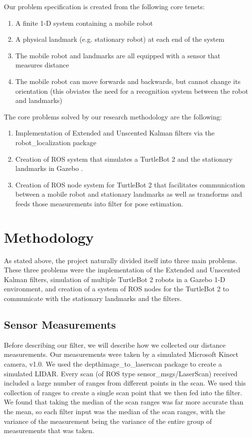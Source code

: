 \documentclass[conference]{IEEEtran} \usepackage[T1]{fontenc} \usepackage[backend=biber, style=ieee]{biblatex}
\begin{document}
Our problem specification is created from the following core tenets:
\begin{enumerate} 
\item A finite 1-D system containing a mobile robot 
\item A physical landmark (e.g. stationary robot) at each end of the system
\item The mobile robot and landmarks are all equipped with a sensor that measures distance 
\item The mobile robot can move forwards and backwards, but cannot change its orientation (this obviates the need for a 
recognition system between the robot and landmarks)
\end{enumerate}

The core problems solved by our research methodology are the following:
\begin{enumerate}
\item Implementation of Extended and Unscented Kalman filters via the robot\_localization package \cite{robot_localization}
\item Creation of ROS system that simulates a TurtleBot 2 and the stationary landmarks in Gazebo \cite{gazebo}.
\item Creation of ROS node system for TurtleBot 2 that facilitates communication between a mobile robot and stationary 
landmarks as well as transforms and feeds those measurements into filter for pose estimation. 
\end{enumerate} 

\section{Methodology} \label{Methodology} As stated above, the project naturally divided itself into three main
problems. These three problems were the implementation of the Extended and Unscented Kalman filters, simulation of multiple
TurtleBot 2 robots in a Gazebo 1-D environment, and creation of a system of ROS nodes for the TurtleBot 2 to communicate with
the stationary landmarks and the filters.

\subsection{Sensor Measurements} \label{Sensor Measurements} Before describing our filter, we will describe how we
collected our distance measurements. Our measurements were taken by a simulated Microsoft Kinect camera, v1.0. We used
the depthimage\_to\_laserscan package \cite{depth_to_scan} to create a simulated LIDAR. Every scan (of ROS type
sensor\_msgs/LaserScan) received included a large number of ranges from different points in the scan. We used this
collection of ranges to create a single scan point that we then fed into the filter. We found that taking the median of
the scan ranges was far more accurate than the mean, so each filter input was the median of the scan ranges, with the
variance of the measurement being the variance of the entire group of measurements that was taken.
\end{document}
